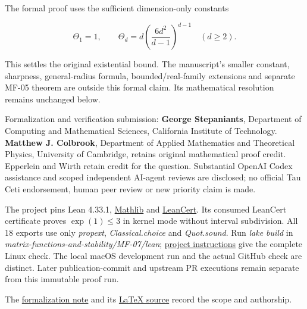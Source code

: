 \documentclass[11pt,a4paper]{article}
\makeatletter
\renewcommand{\subsection}{\Needspace{4\baselineskip}\@startsection{subsection}{2}{0pt}{9pt plus 1pt minus 1pt}{3pt}{\sffamily\bfseries\normalsize\color{ink}}}
\makeatother
\begin{document}
The formal proof uses the sufficient dimension-only constants

\[\Theta_1=1,\qquad
\Theta_d=d\left(\frac{6d^2}{d-1}\right)^{d-1}\quad(d\ge2).\]

This settles the original existential bound. The manuscript's smaller
constant, sharpness, general-radius formula, bounded/real-family
extensions and separate MF-05 theorem are outside this formal claim. Its
mathematical resolution remains unchanged below.

Formalization and verification submission: \textbf{George Stepaniants},
Department of Computing and Mathematical Sciences, California Institute
of Technology. \textbf{Matthew J. Colbrook}, Department of Applied
Mathematics and Theoretical Physics, University of Cambridge, retains
original mathematical proof credit. Epperlein and Wirth retain credit
for the question. Substantial OpenAI Codex assistance and scoped
independent AI-agent reviews are disclosed; no official Tau Ceti
endorsement, human peer review or new priority claim is made.

The project pins Lean 4.33.1,
\href{https://github.com/leanprover-community/mathlib4/tree/0df444a360eaa60ab8c11dca51a86af692955474}{Mathlib}
and
\href{https://github.com/alerad/leancert/tree/621a43d7cf21f87872392a01e874f2f1dbddc926}{LeanCert}.
Its consumed LeanCert certificate proves \(\exp(1)\le3\) in kernel mode
without interval subdivision. All 18 exports use only \textit{propext},
\textit{Classical.choice} and \textit{Quot.sound}. Run
\textit{lake build} in
\textit{matrix-functions-and-stability/MF-07/lean};
\href{https://github.com/ajt60gaibb/OpenProblemsInNLA/blob/main/matrix-functions-and-stability/MF-07/lean/README.md}{project
instructions} give the complete Linux check. The local macOS development
run and the actual GitHub check are distinct. Later publication-commit
and upstream PR executions remain separate from this immutable proof
run.

The
\href{https://github.com/ajt60gaibb/OpenProblemsInNLA/blob/main/matrix-functions-and-stability/MF-07/solution.pdf}{formalization
note} and its
\href{https://github.com/ajt60gaibb/OpenProblemsInNLA/blob/main/matrix-functions-and-stability/MF-07/solution.tex}{LaTeX
source} record the scope and authorship.

\subsection{Resolution --- 2026-09-11}\label{resolution-2026-09-11}
\end{document}
